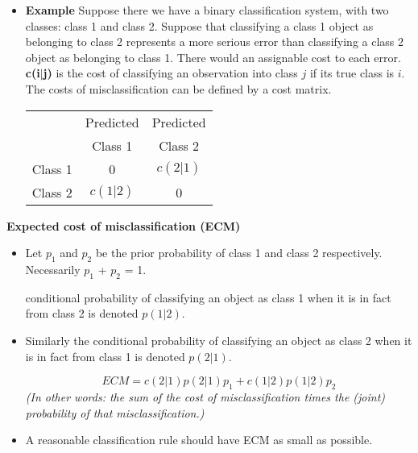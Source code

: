 \begin{itemize}
\item \textbf{Example} Suppose there we have a binary classification system, with two classes: class 1 and class 2.
Suppose that classifying a class 1 object as belonging to class 2 represents a more serious error than classifying a class 2 object as belonging to class 1. There would an assignable cost to each error.
\textbf{c(i$|$j)} is the cost of classifying an observation into class $j$ if its true class is $i$.
The costs of misclassification can be defined by a cost matrix.

\begin{center}
\begin{tabular}{|c|c|c|}
\hline
& Predicted & Predicted \\
& Class 1 & Class 2 \\  \hline
Class 1 & 0 & $c(2|1)$  \\ \hline
Class 2 & $c(1|2)$ & 0 \\
\hline
\end{tabular}
\end{center}

\end{itemize}

\noindent \textbf{Expected cost of misclassification (ECM)}
\begin{itemize}
\item Let $p_1$ and $p_2$ be the prior probability of class 1 and class 2 respectively.
Necessarily $p_1$ + $p_2$ = 1.

\itemThe conditional probability of classifying an object as class 1 when it is in fact from
class 2 is denoted $p(1|2)$.
\item Similarly the conditional probability of classifying an object as class 2 when it is in
fact from class 1 is denoted $p(2|1)$.

\[ECM = c(2|1)p(2|1)p_1 + c(1|2)p(1|2)p_2\]
\textit{(In other words: the sum of the cost of misclassification times the (joint) probability of that misclassification.)}

\item A reasonable classification rule should have ECM as small as possible.
\end{itemize}





